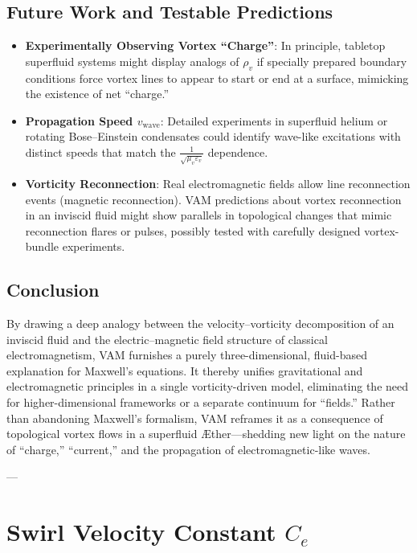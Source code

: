 \documentclass[aps,preprint,superscriptaddress]{revtex4-2}
\begin{document}
    \subsection{Future Work and Testable Predictions}

    \begin{itemize}
        \item \textbf{Experimentally Observing Vortex “Charge”}:  In principle, tabletop superfluid systems might display analogs of \(\rho_v\) if specially prepared boundary conditions force vortex lines to appear to start or end at a surface, mimicking the existence of net “charge.”

        \item \textbf{Propagation Speed \(\displaystyle v_{\mathrm{wave}}\)}:  Detailed experiments in superfluid helium or rotating Bose–Einstein condensates could identify wave-like excitations with distinct speeds that match the \(\tfrac{1}{\sqrt{\mu_v \varepsilon_v}}\) dependence.

        \item \textbf{Vorticity Reconnection}:  Real electromagnetic fields allow line reconnection events (magnetic reconnection). VAM predictions about vortex reconnection in an inviscid fluid might show parallels in topological changes that mimic reconnection flares or pulses, possibly tested with carefully designed vortex-bundle experiments.
    \end{itemize}

    \subsection{Conclusion}

    By drawing a deep analogy between the velocity–vorticity decomposition of an inviscid fluid and the electric–magnetic field structure of classical electromagnetism, VAM furnishes a purely three-dimensional, fluid-based explanation for Maxwell’s equations. It thereby unifies gravitational and electromagnetic principles in a single vorticity-driven model, eliminating the need for higher-dimensional frameworks or a separate continuum for “fields.” Rather than abandoning Maxwell’s formalism, VAM reframes it as a consequence of topological vortex flows in a superfluid Æther—shedding new light on the nature of “charge,” “current,” and the propagation of electromagnetic-like waves.


    ---

    \section{Swirl Velocity Constant \(C_e\)}
\end{document}

